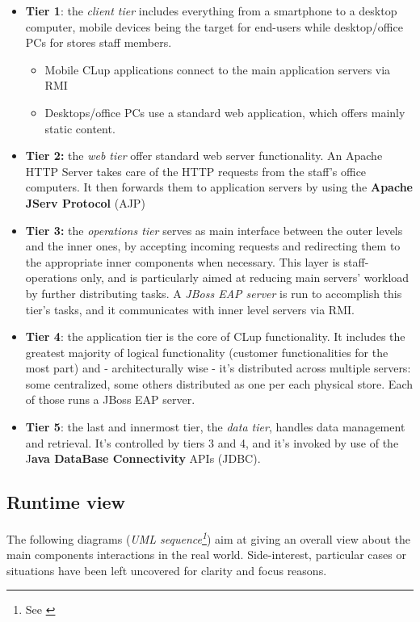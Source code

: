 \begin{itemize}
    \item \textbf{Tier 1}: the \textit{client tier} includes everything from a smartphone to a desktop computer, mobile devices being the target for end-users while desktop/office PCs for stores staff members. 
    \begin{itemize}
        \item Mobile CLup applications connect to the main application servers via RMI
        \item Desktops/office PCs use a standard web application, which offers mainly static content.
    \end{itemize}
    \item \textbf{Tier 2:} the \textit{web tier} offer standard web server functionality. An Apache HTTP Server takes care of the HTTP requests from the staff's office computers. It then forwards them to application servers by using the \textbf{Apache JServ Protocol} (AJP)
    \item \textbf{Tier 3:} the \textit{operations tier} serves as main interface between the outer levels and the inner ones, by accepting incoming requests and redirecting them to the appropriate inner components when necessary. This layer is staff-operations only, and is particularly aimed at reducing main servers' workload by further distributing tasks. A \textit{JBoss EAP server} is run to accomplish this tier's tasks, and it communicates with inner level servers via RMI.
    \item \textbf{Tier 4}: the application tier is the core of CLup functionality. It includes the greatest majority of logical functionality (customer functionalities for the most part) and - architecturally wise - it's distributed across multiple servers: some centralized, some others distributed as one per each physical store. Each of those runs a JBoss EAP server. 
    \item \textbf{Tier 5}: the last and innermost tier, the \textit{data tier}, handles data management and retrieval. It's controlled by tiers 3 and 4, and it's invoked by use of the J\textbf{ava DataBase Connectivity} APIs (JDBC).

\end{itemize}

\subsection{Runtime view}
The following diagrams (\textit{UML sequence\footnote{See \cite{UML:ref}}}) aim at giving an overall view about the main components interactions in the real world. Side-interest, particular cases or situations have been left uncovered for clarity and focus reasons.\newline



